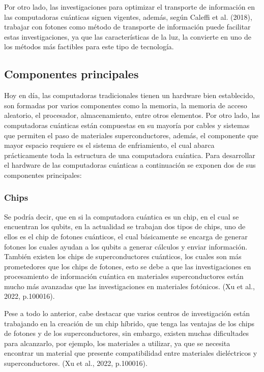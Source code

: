 \documentclass{article}
\begin{document}
Por otro lado, las investigaciones para optimizar el transporte de información en las computadoras cuánticas siguen vigentes, además, según Caleffi et al. (2018), trabajar con fotones como método de transporte de información puede facilitar estas investigaciones, ya que las características de la luz, la convierte en uno de los métodos más factibles para este tipo de tecnología.

\subsection{Componentes principales}
Hoy en día, las computadoras tradicionales tienen un hardware bien establecido, son formadas por varios componentes como la memoria, la memoria de acceso aleatorio, el procesador, almacenamiento, entre otros elementos.
Por otro lado, las computadoras cuánticas están compuestas en su mayoría por cables y sistemas que permiten el paso de materiales superconductores, además, el componente que mayor espacio requiere es el sistema de enfriamiento, el cual abarca prácticamente toda la estructura de una computadora cuántica. Para desarrollar el hardware de las computadoras cuánticas a continuación se exponen dos de sus componentes principales:

\subsubsection{Chips}
Se podría decir, que en si la computadora cuántica es un chip, en el cual se encuentran los qubits, en la actualidad se trabajan dos tipos de chips, uno de ellos es el chip de fotones cuánticos, el cual básicamente se encarga de generar fotones los cuales ayudan a los qubits a generar cálculos y enviar información. También existen los chips de superconductores cuánticos, los cuales son más prometedores que los chips de fotones, esto se debe a que las investigaciones en procesamiento de información cuántica en materiales superconductores están mucho más avanzadas que las investigaciones en materiales fotónicos. (Xu et al., 2022, p.100016).

Pese a todo lo anterior, cabe destacar que varios centros de investigación están trabajando en la creación de un chip híbrido, que tenga las ventajas de los chips de fotones y de los superconductores, sin embargo, existen muchas dificultades para alcanzarlo, por ejemplo, los materiales a utilizar, ya que se necesita encontrar un material que presente compatibilidad entre materiales dieléctricos y superconductores. (Xu et al., 2022, p.100016).
\end{document}
